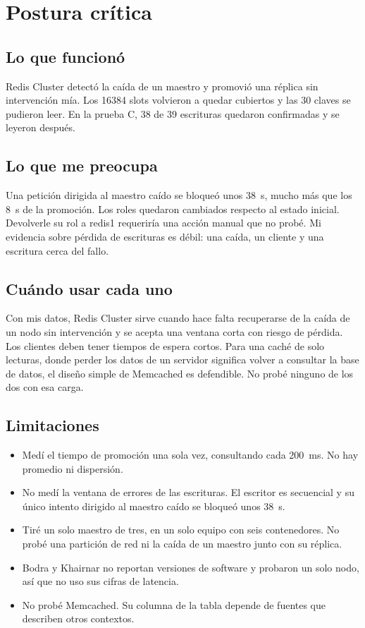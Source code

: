\documentclass[11pt,a4paper]{article}
\begin{document}
\section{Postura crítica}

\subsection{Lo que funcionó}

Redis Cluster detectó la caída de un maestro y promovió una réplica sin intervención mía. Los 16384 slots volvieron a quedar cubiertos y las 30 claves se pudieron leer. En la prueba C, 38 de 39 escrituras quedaron confirmadas y se leyeron después.

\subsection{Lo que me preocupa}

Una petición dirigida al maestro caído se bloqueó unos 38~s, mucho más que los 8~s de la promoción. Los roles quedaron cambiados respecto al estado inicial. Devolverle su rol a redis1 requeriría una acción manual que no probé. Mi evidencia sobre pérdida de escrituras es débil: una caída, un cliente y una escritura cerca del fallo.

\subsection{Cuándo usar cada uno}

Con mis datos, Redis Cluster sirve cuando hace falta recuperarse de la caída de un nodo sin intervención y se acepta una ventana corta con riesgo de pérdida. Los clientes deben tener tiempos de espera cortos. Para una caché de solo lecturas, donde perder los datos de un servidor significa volver a consultar la base de datos, el diseño simple de Memcached es defendible. No probé ninguno de los dos con esa carga.

\subsection{Limitaciones}

\begin{itemize}
  \item Medí el tiempo de promoción una sola vez, consultando cada 200~ms. No hay promedio ni dispersión.
  \item No medí la ventana de errores de las escrituras. El escritor es secuencial y su único intento dirigido al maestro caído se bloqueó unos 38~s.
  \item Tiré un solo maestro de tres, en un solo equipo con seis contenedores. No probé una partición de red ni la caída de un maestro junto con su réplica.
  \item Bodra y Khairnar no reportan versiones de software y probaron un solo nodo, así que no uso sus cifras de latencia.
  \item No probé Memcached. Su columna de la tabla depende de fuentes que describen otros contextos.
\end{itemize}
\end{document}
